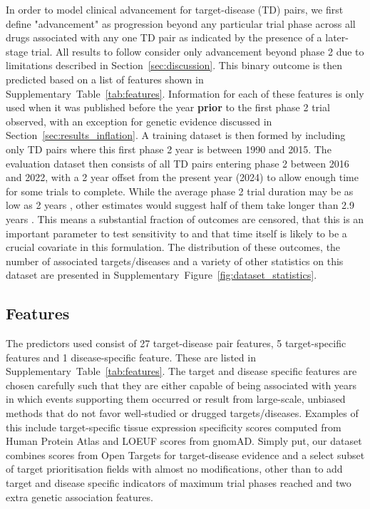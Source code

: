 \documentclass{article}
\begin{document}
In order to model clinical advancement for target-disease (TD) pairs, we first define "advancement" as progression beyond any particular trial phase across all drugs associated with any one TD pair as indicated by the presence of a later-stage trial. All results to follow consider only advancement beyond phase 2 due to limitations described in Section~\ref{sec:discussion}. This binary outcome is then predicted based on a list of features shown in Supplementary~Table~\ref{tab:features}. Information for each of these features is only used when it was published before the year \textbf{prior} to the first phase 2 trial observed, with an exception for genetic evidence discussed in Section~\ref{sec:results_inflation}. A training dataset is then formed by including only TD pairs where this first phase 2 year is between 1990 and 2015. The evaluation dataset then consists of all TD pairs entering phase 2 between 2016 and 2022, with a 2 year offset from the present year (2024) to allow enough time for some trials to complete. While the average phase 2 trial duration may be as low as 2 years \cite{fdaStepClinical}, other estimates would suggest half of them take longer than 2.9 years \cite{PMID:29394327}. This means a substantial fraction of outcomes are censored, that this is an important parameter to test sensitivity to and that time itself is likely to be a crucial covariate in this formulation. The distribution of these outcomes, the number of associated targets/diseases and a variety of other statistics on this dataset are presented in Supplementary~Figure~\ref{fig:dataset_statistics}.

\subsection{Features}

The predictors used consist of 27 target-disease pair features, 5 target-specific features and 1 disease-specific feature. These are listed in Supplementary~Table~\ref{tab:features}. The target and disease specific features are chosen carefully such that they are either capable of being associated with years in which events supporting them occurred or result from large-scale, unbiased methods that do not favor well-studied or drugged targets/diseases. Examples of this include target-specific tissue expression specificity scores computed from Human Protein Atlas \cite{PMID:25613900} and LOEUF \cite{PMID:32461654} scores from gnomAD. Simply put, our dataset combines scores from Open Targets for target-disease evidence and a select subset of target prioritisation \cite{OT23.12release} fields with almost no modifications, other than to add target and disease specific indicators of maximum trial phases reached and two extra genetic association features.
\end{document}
